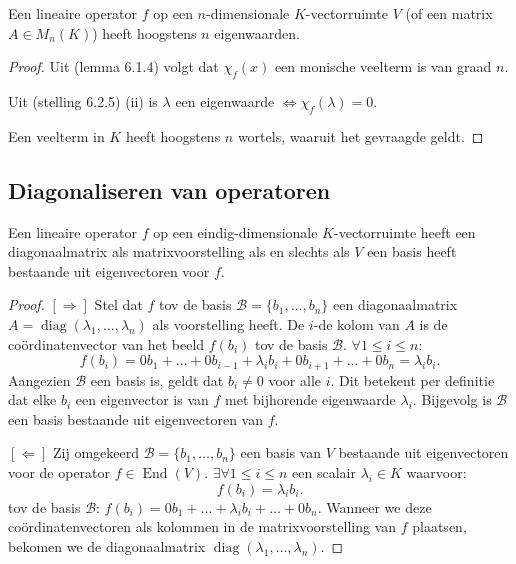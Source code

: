 \begin{gevolg}[6.2.6]
    Een lineaire operator $f$ op een $n$-dimensionale $K$-vectorruimte $V$ (of een matrix $A \in M_n(K)$) heeft hoogstens $n$ eigenwaarden.
\end{gevolg}
\begin{proof}
    Uit (lemma 6.1.4) volgt dat \(\chi_f(x)\) een monische veelterm is van graad \(n\).

    Uit (stelling 6.2.5) (ii) is \(\lambda\) een eigenwaarde
    \(\iff \chi_f(\lambda) = 0. \)

    Een veelterm in \(K\) heeft hoogstens \(n\) wortels, waaruit het gevraagde geldt.

\end{proof}

\subsection{Diagonaliseren van operatoren}

\begin{stelling}[6.3.1]
    Een lineaire operator $f$ op een eindig-dimensionale $K$-vectorruimte heeft een diagonaalmatrix als matrixvoorstelling als en slechts als $V$ een basis heeft bestaande uit eigenvectoren voor $f$.
\end{stelling}
\begin{proof}
    $[\Rightarrow]$ Stel dat $f$ tov de basis $\mathcal{B} = \{b_1, \dots, b_n\}$ een diagonaalmatrix $A = \operatorname{diag}(\lambda_1, \dots, \lambda_n)$ als voorstelling heeft.
     De $i$-de kolom van $A$ is de coördinatenvector van het beeld $f(b_i)$ tov de basis $\mathcal{B}$.
    $ \forall 1 \le i \le n$:
    \[ f(b_i) = 0b_1 + \dots + 0b_{i-1} + \lambda_i b_i + 0b_{i+1} + \dots + 0b_n = \lambda_i b_i. \]
    Aangezien $\mathcal{B}$ een basis is, geldt dat $b_i \neq 0$ voor alle $i$.
    Dit betekent per definitie dat elke $b_i$ een eigenvector is van $f$ met bijhorende eigenwaarde $\lambda_i$.
    Bijgevolg is $\mathcal{B}$ een basis bestaande uit eigenvectoren van $f$.

    $[\Leftarrow]$ Zij omgekeerd $\mathcal{B} = \{b_1, \dots, b_n\}$ een basis van $V$ bestaande uit eigenvectoren voor de operator $f \in \operatorname{End}(V)$.
    $\exists \forall 1 \le i \le n$ een scalair $\lambda_i \in K$ waarvoor:
    \[ f(b_i) = \lambda_i b_i. \]
    tov de basis $\mathcal{B}$:
    \(f(b_i) = 0b_1 + \dots + \lambda_i b_i + \dots + 0b_n. \)
    Wanneer we deze coördinatenvectoren als kolommen in de matrixvoorstelling van $f$ plaatsen, bekomen we de diagonaalmatrix $\operatorname{diag}(\lambda_1, \dots, \lambda_n)$.
\end{proof}


